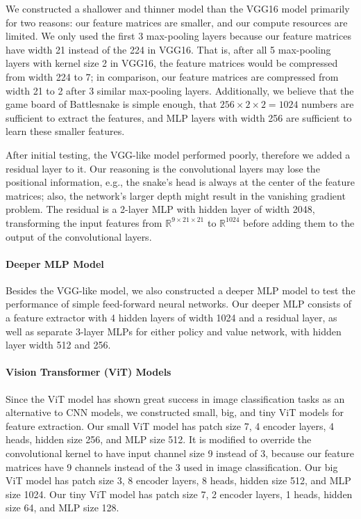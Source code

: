 \documentclass[conference]{IEEEtran}
\begin{document}
We constructed a shallower and thinner model than the VGG16 model primarily for
two reasons: our feature matrices are smaller,
and our compute resources are limited.
We only used the first 3 max-pooling layers because our feature matrices have
width 21 instead of the 224 in VGG16. That is,
after all 5 max-pooling layers with kernel size 2 in VGG16,
the feature matrices would be compressed from width 224 to 7; in comparison,
our feature matrices are compressed from width 21 to 2 after 3 similar
max-pooling layers.
Additionally, we believe that the game board of Battlesnake is simple enough,
that $256\times 2\times 2=1024$ numbers are sufficient to extract the features,
and MLP layers with width 256 are sufficient to learn these smaller features.

After initial testing, the VGG-like model performed poorly,
therefore we added a residual layer to it.
Our reasoning is the convolutional layers may lose the positional information,
e.g., the snake's head is always at the center of the feature matrices;
also, the network's larger depth might result in the vanishing gradient problem.
The residual is a 2-layer MLP with hidden layer of width 2048,
transforming the input features from $\mathbb R^{9\times 21\times 21}$ to
$\mathbb R^{1024}$ before adding them to the output of the convolutional layers.

\paragraph{Deeper MLP Model}
Besides the VGG-like model,
we also constructed a deeper MLP model to test the performance of simple
feed-forward neural networks.
Our deeper MLP consists of a feature extractor with 4 hidden layers of width
1024 and a residual layer,
as well as separate 3-layer MLPs for either policy and value network,
with hidden layer width 512 and 256.

\paragraph{Vision Transformer (ViT) Models}
Since the ViT model has shown great success in image classification tasks as an
alternative to CNN models,
we constructed small, big, and tiny ViT models for feature extraction.
Our small ViT model has patch size 7, 4 encoder layers, 4 heads, hidden size 256,
and MLP size 512.
It is modified to override the convolutional kernel to have input channel size 9
instead of 3,
because our feature matrices have 9 channels instead of the 3 used in image
classification.
Our big ViT model has patch size 3, 8 encoder layers, 8 heads, hidden size 512,
and MLP size 1024.
Our tiny ViT model has patch size 7, 2 encoder layers, 1 heads, hidden size 64,
and MLP size 128.
\end{document}
